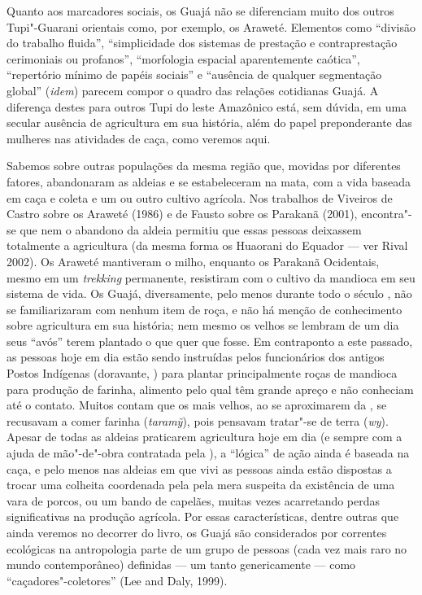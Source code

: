 Quanto aos marcadores sociais, os Guajá não se diferenciam muito dos
outros Tupi"-Guarani orientais como, por exemplo, os Araweté. Elementos
como ``divisão do trabalho fluida'', ``simplicidade dos sistemas de
prestação e contraprestação cerimoniais ou profanos'', ``morfologia
espacial aparentemente caótica'', ``repertório mínimo de papéis
sociais'' e ``ausência de qualquer segmentação global'' (\emph{idem}) parecem
compor o quadro das relações cotidianas Guajá. A diferença destes para
outros Tupi do leste Amazônico está, sem dúvida, em uma secular ausência
de agricultura em sua história, além do papel preponderante das mulheres
nas atividades de caça, como veremos aqui.

Sabemos sobre outras populações da mesma região que, movidas por
diferentes fatores, abandonaram as aldeias e se estabeleceram na mata,
com a vida baseada em caça e coleta e um ou outro cultivo agrícola. Nos
trabalhos de Viveiros de Castro sobre os Araweté (1986) e de Fausto
sobre os Parakanã (2001), encontra"-se que nem o abandono da aldeia
permitiu que essas pessoas deixassem totalmente a agricultura (da mesma
forma os Huaorani do Equador --- ver Rival 2002). Os Araweté mantiveram o
milho, enquanto os Parakanã Ocidentais, mesmo em um \emph{trekking}
permanente, resistiram com o cultivo da mandioca em seu sistema de vida.
Os Guajá, diversamente, pelo menos durante todo o século , não se
familiarizaram com nenhum item de roça, e não há menção de conhecimento
sobre agricultura em sua história; nem mesmo os velhos se lembram de um
dia seus ``avós'' terem plantado o que quer que fosse. Em contraponto a
este passado, as pessoas hoje em dia estão sendo instruídas pelos
funcionários dos antigos Postos Indígenas (doravante, ) para plantar
principalmente roças de mandioca para produção de farinha, alimento pelo
qual têm grande apreço e não conheciam até o contato. Muitos contam que
os mais velhos, ao se aproximarem da , se recusavam a comer farinha
(\emph{taramỹ}), pois pensavam tratar"-se de terra (\emph{wy}). Apesar de
todas as aldeias praticarem agricultura hoje em dia (e sempre com a
ajuda de mão"-de"-obra contratada pela ), a ``lógica'' de ação ainda é
baseada na caça, e pelo menos nas aldeias em que vivi as pessoas ainda
estão dispostas a trocar uma colheita coordenada pela  pela mera
suspeita da existência de uma vara de porcos, ou um bando de capelães,
muitas vezes acarretando perdas significativas na produção agrícola. Por
essas características, dentre outras que ainda veremos no decorrer do
livro, os Guajá são considerados por correntes ecológicas na
antropologia parte de um grupo de pessoas (cada vez mais raro no mundo
contemporâneo) definidas --- um tanto genericamente --- como
``caçadores"-coletores'' (Lee and Daly, 1999).

